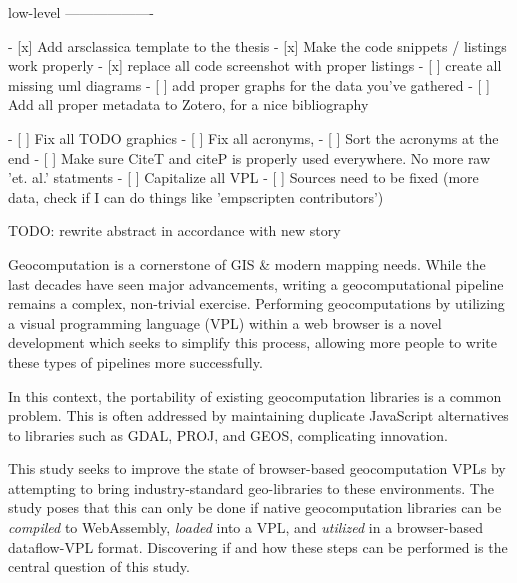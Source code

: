 \begin{note}
    low-level 
    -------------------
    
    - [x] Add arsclassica template to the thesis
    - [x] Make the code snippets / listings work properly
    - [x] replace all code screenshot with proper listings
    - [ ] create all missing uml diagrams
    - [ ] add proper graphs for the data you've gathered 
    - [ ] Add all proper metadata to Zotero, for a nice bibliography
    
    - [ ] Fix all TODO graphics
    - [ ] Fix all acronyms,
    - [ ] Sort the acronyms at the end 
    - [ ] Make sure CiteT and citeP is properly used everywhere. No more raw 'et. al.' statments 
    - [ ] Capitalize all VPL
    - [ ] Sources need to be fixed (more data, check if I can do things like 'empscripten contributors')





\end{note}

\begin{note}
    TODO: rewrite abstract in accordance with new story
\end{note}

Geocomputation is a cornerstone of GIS \& modern mapping needs.
While the last decades have seen major advancements, writing a geocomputational pipeline remains a complex, non-trivial exercise. 
Performing geocomputations by utilizing a visual programming language (VPL) within a web browser is a novel development which seeks to simplify this process, allowing more people to write these types of pipelines more successfully.

In this context, the portability of existing geocomputation libraries is a common problem.
This is often addressed by maintaining duplicate JavaScript alternatives to libraries such as GDAL, PROJ, and GEOS, complicating innovation.  

This study seeks to improve the state of browser-based geocomputation VPLs by attempting to bring industry-standard geo-libraries to these environments. 
The study poses that this can only be done if native geocomputation libraries can be \emph{compiled} to WebAssembly, \emph{loaded} into a VPL, and \emph{utilized} in a browser-based dataflow-VPL format.
Discovering if and how these steps can be performed is the central question of this study. 

